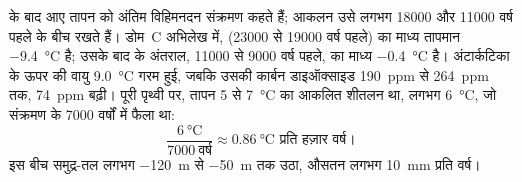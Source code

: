 \begin{example}[अंतिम विहिमनदन]
 के बाद आए तापन को अंतिम
विहिमनदन संक्रमण कहते हैं; आकलन उसे लगभग \num{18000} और
\num{11000} वर्ष पहले के बीच रखते हैं। डोम~C अभिलेख में,
 (\num{23000} से \num{19000} वर्ष पहले) का माध्य तापमान
\qty{-9.4}{\degreeCelsius} है; उसके बाद के अंतराल, \num{11000} से
\num{9000} वर्ष पहले, का माध्य \qty{-0.4}{\degreeCelsius} है। अंटार्कटिका के ऊपर की वायु
\qty{9.0}{\degreeCelsius} गरम हुई, जबकि उसकी कार्बन डाइऑक्साइड
\qty{190}{ppm} से \qty{264}{ppm} तक, \qty{74}{ppm} बढ़ी। पूरी पृथ्वी पर,
तापन 5 से \qty{7}{\degreeCelsius} का आकलित शीतलन था, लगभग
\qty{6}{\degreeCelsius}, जो संक्रमण के \num{7000} वर्षों में फैला था:
\[
  \frac{\qty{6}{\degreeCelsius}}{\num{7000}\ \text{वर्ष}} \approx
  \qty{0.86}{\degreeCelsius} \text{ प्रति हज़ार वर्ष।}
\]
इस बीच समुद्र-तल लगभग \qty{-120}{m} से \qty{-50}{m} तक उठा, औसतन लगभग
\qty{10}{mm} प्रति वर्ष।
\end{example}


